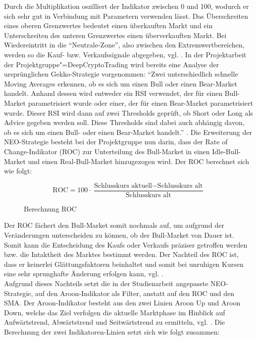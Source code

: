 Durch die Multiplikation oszilliert der Indikator zwischen 0 und 100, wodurch er sich sehr gut in Verbindung mit Parametern verwenden lässt. Das Überschreiten eines oberen Grenzwertes bedeutet einen überkauften Markt und ein Unterschreiten des unteren Grenzwertes einen überverkauften Markt. Bei Wiedereintritt in die "`Neutrale-Zone"', also zwischen den Extremwertbereichen, werden so die Kauf- bzw. Verkaufssignale abgegeben, vgl. \cite{ber20}. In der Projektarbeit der Projektgruppe"=DeepCryptoTrading wird bereits eine Analyse der ursprünglichen Gekko-Strategie vorgenommen: "`Zwei unterschiedlich schnelle Moving Averages erkennen, ob es sich um einen Bull oder einen Bear-Market handelt. Anhand dessen wird entweder ein RSI verwendet, der für einen Bull-Market parametrisiert wurde oder einer, der für einen Bear-Market parametrisiert wurde. Dieser RSI wird dann auf zwei Thresholds geprüft, ob Short oder Long als Advice gegeben werden soll. Diese Thresholds sind dabei auch abhängig davon, ob es sich um einen Bull- oder einen Bear-Market handelt."' \cite{pro19}. Die Erweiterung der NEO-Strategie besteht bei der Projektgruppe nun darin, dass der Rate of Change-Indikator (ROC) zur Unterteilung des Bull-Market in einen Idle-Bull-Market und einen Real-Bull-Market hinzugezogen wird. Der ROC berechnet sich wie folgt: \\ 

\begin{figure}[!ht]
\begin{equation*}
\text{ROC}=100\cdot\frac{\text{Schlusskurs aktuell}- \text{Schlusskurs alt}}{\text{Schlusskurs alt}}
\end{equation*}
\caption{Berechnung ROC}
\end{figure}



Der ROC fächert den Bull-Market somit nochmals auf, um aufgrund der Veränderungen unterscheiden zu können, ob der Bull-Market von Dauer ist. Somit kann die Entscheidung des Kaufs oder Verkaufs präziser getroffen werden bzw. die Intaktheit des Marktes bestimmt werden. Der Nachteil des ROC ist, dass er keinerlei Glättungsfaktoren beinhaltet und somit bei unruhigen Kursen eine sehr sprunghafte Änderung erfolgen kann, vgl. \cite{tra20}.\\

Aufgrund dieses Nachteils setzt die in der Studienarbeit angepasste NEO-Strategie, auf den Aroon-Indikator als Filter, anstatt auf den ROC und den SMA. Der Aroon-Indikator besteht aus den zwei Linien Aroon Up und Aroon Down, welche das Ziel verfolgen die aktuelle Marktphase im Hinblick auf Aufwärtstrend, Abwärtstrend und Seitwärtstrend zu ermitteln, vgl. \cite{ber201}. Die Berechnung der zwei Indikatoren-Linien setzt sich wie folgt zusammen: \\

